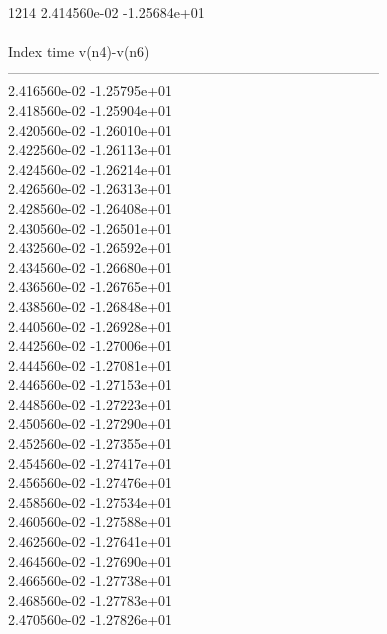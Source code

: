 1214	2.414560e-02	-1.25684e+01	\\ \hline
\\ \hline
Index   time            v(n4)-v(n6)     \\ \hline
--------------------------------------------------------------------------------\\ 	2.416560e-02	-1.25795e+01	\\ 	2.418560e-02	-1.25904e+01	\\ 	2.420560e-02	-1.26010e+01	\\ 	2.422560e-02	-1.26113e+01	\\ 	2.424560e-02	-1.26214e+01	\\ 	2.426560e-02	-1.26313e+01	\\ 	2.428560e-02	-1.26408e+01	\\ 	2.430560e-02	-1.26501e+01	\\ 	2.432560e-02	-1.26592e+01	\\ 	2.434560e-02	-1.26680e+01	\\ 	2.436560e-02	-1.26765e+01	\\ 	2.438560e-02	-1.26848e+01	\\ 	2.440560e-02	-1.26928e+01	\\ 	2.442560e-02	-1.27006e+01	\\ 	2.444560e-02	-1.27081e+01	\\ 	2.446560e-02	-1.27153e+01	\\ 	2.448560e-02	-1.27223e+01	\\ 	2.450560e-02	-1.27290e+01	\\ 	2.452560e-02	-1.27355e+01	\\ 	2.454560e-02	-1.27417e+01	\\ 	2.456560e-02	-1.27476e+01	\\ 	2.458560e-02	-1.27534e+01	\\ 	2.460560e-02	-1.27588e+01	\\ 	2.462560e-02	-1.27641e+01	\\ 	2.464560e-02	-1.27690e+01	\\ 	2.466560e-02	-1.27738e+01	\\ 	2.468560e-02	-1.27783e+01	\\ 	2.470560e-02	-1.27826e+01	\\ \hline
